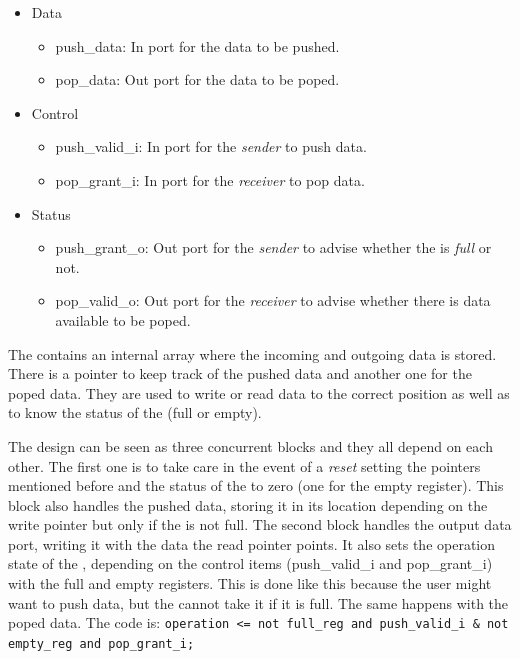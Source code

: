 \documentclass[12pt]{article}
\begin{document}
\begin{itemize}
	\item Data
	\begin{itemize}
		\item push\_data: In port for the data to be pushed.
		\item pop\_data: Out port for the data to be poped.
	\end{itemize}
	\item Control
	\begin{itemize}
		\item push\_valid\_i: In port for the \textit{sender} to push data.
		\item pop\_grant\_i: In port for the \textit{receiver} to pop data.
	\end{itemize}
	\item Status
	\begin{itemize}
		\item push\_grant\_o: Out port for the \textit{sender} to advise whether the \fifo is \textit{full} or not.
		\item pop\_valid\_o: Out port for the \textit{receiver} to advise whether there is data available to be poped.
	\end{itemize}
\end{itemize}

The \fifo contains an internal array where the incoming and outgoing data is stored.  There is a pointer to keep track of the pushed data and another one for the poped data.  They are used to write or read data to the correct position as well as to know the status of the \fifo (full or empty).

The design can be seen as three concurrent blocks and they all depend on each other.  The first one is to take care in the event of a \textit{reset} setting the pointers mentioned before and the status of the \fifo to zero (one for the empty register).  This block also handles the pushed data, storing it in its location depending on the write pointer but only if the \fifo is not full.  The second block handles the output data port, writing it with the data the read pointer points.  It also sets the operation state of the \fifo, depending on the control items (push\_valid\_i and pop\_grant\_i) with the full and empty registers.  This is done like this because the user might want to push data, but the \fifo cannot take it if it is full.  The same happens with the poped data.  The \vhdl code is: \texttt{operation <= not full\_reg and push\_valid\_i \& not empty\_reg and pop\_grant\_i;}
\end{document}
